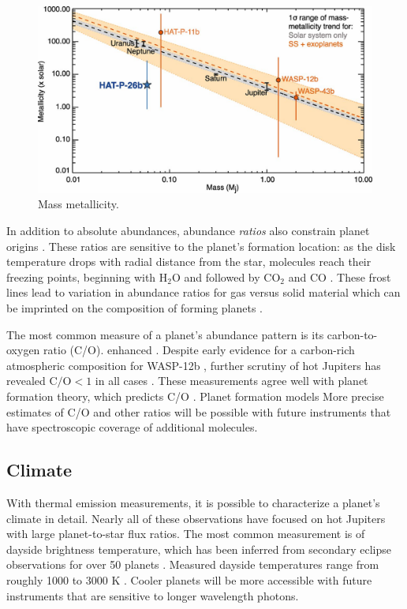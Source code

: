 \documentclass[graybox,natbib,nosecnum]{svmult}
\begin{document}
\begin{figure}
\begin{centering}
\includegraphics[scale=.8]{Figures/wakeford.jpg}
\caption{Mass metallicity.}
\label{fig:massZ}       
\end{centering}
\end{figure}

In addition to absolute abundances, abundance \emph{ratios} also constrain planet origins \citep{FIXME}. These ratios are sensitive to the planet's formation location: as the disk temperature drops with radial distance from the star, molecules reach their freezing points, beginning with H$_2$O and followed by CO$_2$ and CO \citep{oberg11}. These frost lines lead to variation in abundance ratios for gas versus solid material which can be imprinted on the composition of forming planets \citep{madhusudhan14, alidib16, mordasini16}.

The most common measure of a planet's abundance pattern is its carbon-to-oxygen ratio (C/O). enhanced \citep{madhusudhan12}.  Despite early evidence for a carbon-rich atmospheric composition for WASP-12b \citep{madhusudhan11}, further scrutiny of hot Jupiters has revealed $\mathrm{C/O} < 1$ in all cases \citep{line14, kreidberg15b, benneke15}.  These measurements agree well with planet formation theory, which predicts C/O  \citep[e.g.][]{madhusudhan14, mordasini16}. Planet formation models More precise estimates of C/O and other ratios will be possible with future instruments that have spectroscopic coverage of additional molecules. 


\subsection{Climate}
With thermal emission measurements, it is possible to characterize a planet's climate in detail.  Nearly all of these observations have focused on hot Jupiters with large planet-to-star flux ratios. The most common measurement is of dayside brightness temperature, which has been inferred from secondary eclipse observations for over 50 planets \citep{schwartz15}. Measured dayside temperatures range from roughly 1000 to 3000 K \citep{stevenson14b, kammer15, morley17}.  Cooler planets will be more accessible with future instruments that are sensitive to longer wavelength photons.
\end{document}
